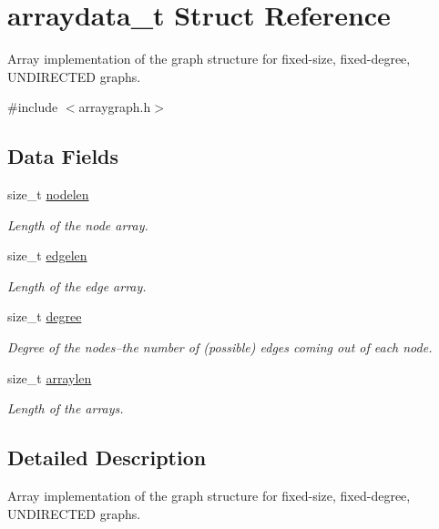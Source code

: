 \hypertarget{structarraydata__t}{}\section{arraydata\+\_\+t Struct Reference}
\label{structarraydata__t}


Array implementation of the graph structure for fixed-\/size, fixed-\/degree, U\+N\+D\+I\+R\+E\+C\+T\+ED graphs.  




{\ttfamily \#include $<$arraygraph.\+h$>$}

\subsection*{Data Fields}
\begin{DoxyCompactItemize}
\item 
size\+\_\+t \hyperlink{structarraydata__t_ab7b4b6740dd5353c323233dea2e2eaee}{nodelen}
\begin{DoxyCompactList}\small\item\em Length of the node array. \end{DoxyCompactList}\item 
size\+\_\+t \hyperlink{structarraydata__t_a1bcdcd2b541e02eb0d20be0563a1f447}{edgelen}
\begin{DoxyCompactList}\small\item\em Length of the edge array. \end{DoxyCompactList}\item 
size\+\_\+t \hyperlink{structarraydata__t_af48476cee5ba6969a23157f07788f304}{degree}
\begin{DoxyCompactList}\small\item\em Degree of the nodes--the number of (possible) edges coming out of each node. \end{DoxyCompactList}\item 
size\+\_\+t \hyperlink{structarraydata__t_a2a07b4b41c935e1a5acba14d3df92a45}{arraylen}
\begin{DoxyCompactList}\small\item\em Length of the arrays. \end{DoxyCompactList}\end{DoxyCompactItemize}


\subsection{Detailed Description}
Array implementation of the graph structure for fixed-\/size, fixed-\/degree, U\+N\+D\+I\+R\+E\+C\+T\+ED graphs. 

